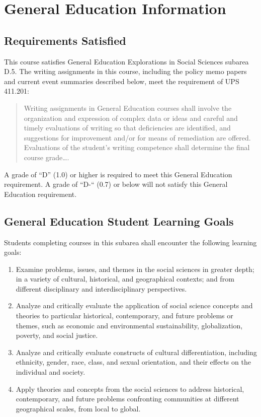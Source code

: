 \documentclass[11pt, letterpaper]{article}
\begin{document}
\section{General Education Information}

\subsection*{Requirements Satisfied}

	This course satisfies General Education Explorations in Social Sciences subarea D.5. The writing assignments in this course, including the policy memo papers and current event summaries described below, meet the requirement of UPS 411.201: 
	\begin{quote}Writing assignments in General Education courses shall involve the organization and expression of complex data or ideas and careful and timely evaluations of writing so that deficiencies are identified, and suggestions for improvement and/or for means of remediation are offered. Evaluations of the student's writing competence shall determine the final course grade\ldots .\end{quote}
    A grade of “D” (1.0) or higher is required to meet this General Education requirement. A grade of “D-“ (0.7) or below will not satisfy this General Education requirement.

\subsection*{General Education Student Learning Goals}

	Students completing courses in this subarea shall encounter the following learning goals:

\begin{enumerate}
	\item Examine problems, issues, and themes in the social sciences in greater depth; in a variety of cultural, historical, and geographical contexts; and from different disciplinary and interdisciplinary perspectives.
	\item Analyze and critically evaluate the application of social science concepts and theories to particular historical, contemporary, and future problems or themes, such as economic and environmental sustainability, globalization, poverty, and social justice.
	\item Analyze and critically evaluate constructs of cultural differentiation, including ethnicity, gender, race, class, and sexual orientation, and their effects on the individual and society.
	\item Apply theories and concepts from the social sciences to address historical, contemporary, and future problems confronting communities at different geographical scales, from local to global.
\end{enumerate}
\end{document}
